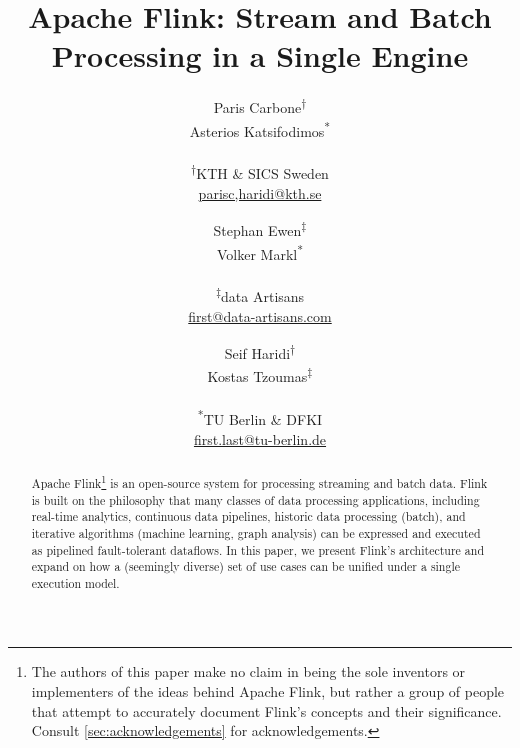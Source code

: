 \documentclass[11pt]{article}
\begin{document}
\title{Apache Flink\texttrademark: Stream and Batch Processing in a Single Engine}

\author{Paris Carbone\textsuperscript{$\dagger$} \\ Asterios Katsifodimos\textsuperscript{*} \\\\ \small{ \textsf{\small \textsuperscript{$\dagger$}KTH \& SICS Sweden}} \\ \small \href{parisc,haridi@kth.se}{parisc,haridi@kth.se}
\and Stephan Ewen\textsuperscript{$\ddagger$} \\ Volker Markl\textsuperscript{*} \\\\ \small \textsf{\textsuperscript{$\ddagger$}data Artisans} \\ \small \href{first@data-artisans.com}{first@data-artisans.com}
\and Seif Haridi\textsuperscript{$\dagger$} \\ Kostas Tzoumas\textsuperscript{$\ddagger$} \\\\ \small \textsf{\textsuperscript{*}TU Berlin \& DFKI} \\ \small \href{fist.last@tu-berlin.de}{first.last@tu-berlin.de}
%
\vspace{-5mm}
}


\maketitle

\begin{abstract}
Apache Flink\footnote{The authors of this paper make no claim in being the sole inventors or implementers of the ideas behind Apache Flink, but rather a group of people that attempt to accurately document Flink's concepts and their significance. Consult \autoref{sec:acknowledgements} for acknowledgements.} is an open-source system for processing streaming and batch data. Flink is built on the philosophy that many classes of data processing applications, including real-time analytics, continuous data pipelines, historic data processing (batch), and iterative algorithms (machine learning, graph analysis) can be expressed and executed as pipelined fault-tolerant dataflows. In this paper, we present Flink's architecture and expand on how a (seemingly diverse) set of use cases can be unified under a single execution model.
\end{abstract}
\end{document}
